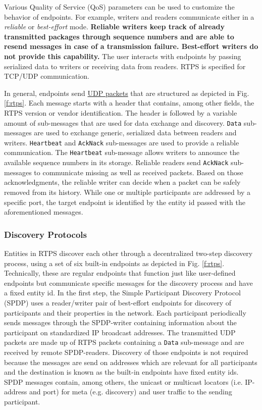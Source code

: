 Various Quality of Service (QoS) parameters can be used to customize the behavior of endpoints. For example, writers and readers communicate either in a \textit{reliable} or \textit{best-effort} mode. \textbf{Reliable writers keep track of already transmitted packages through sequence numbers and are able to resend messages in case of a transmission failure. Best-effort writers do not provide this capability.} The user interacts with endpoints by passing serialized data to writers or receiving data from readers. RTPS is specified for TCP/UDP communication.

In general, endpoints send \underline{UDP packets} that are structured as depicted in Fig. \ref{f:rtps}. Each message starts with a header that contains, among other fields, the RTPS version or vendor identification. The header is followed by a variable amount of sub-messages that are used for data exchange and discovery. \texttt{Data} sub-messages are used to exchange generic, serialized data between readers and writers. \texttt{Heartbeat} and \texttt{AckNack} sub-messages are used to provide a reliable communication. The \texttt{Heartbeat} sub-message allows writers to announce the available sequence numbers in its storage. Reliable readers send \texttt{AckNack} sub-messages to communicate missing as well as received packets. Based on those acknowledgments, the reliable writer can decide when a packet can be safely removed from its history. While one or multiple participants are addressed by a specific port, the target endpoint is identified by the entity id passed with the aforementioned messages.

\subsubsection{Discovery Protocols}
Entities in RTPS discover each other through a decentralized two-step discovery process, using a set of six built-in endpoints as depicted in Fig. \ref{f:rtps}. Technically, these are regular endpoints that function just like user-defined endpoints but communicate specific messages for the discovery process and have a fixed entity id. In the first step, the Simple Participant Discovery Protocol (SPDP) uses a reader/writer pair of best-effort endpoints for discovery of participants and their properties in the network. Each participant periodically sends messages through the SPDP-writer containing information about the participant on standardized IP broadcast addresses. The transmitted UDP packets are made up of RTPS packets containing a \texttt{Data} sub-message and are received by remote SPDP-readers. Discovery of those endpoints is not required because the messages are send on addresses which are relevant for all participants and the destination is known as the built-in endpoints have fixed entity ids. SPDP messages contain, among others, the unicast or multicast locators (i.e. IP-address and port) for meta (e.g. discovery) and user traffic to the sending participant.

